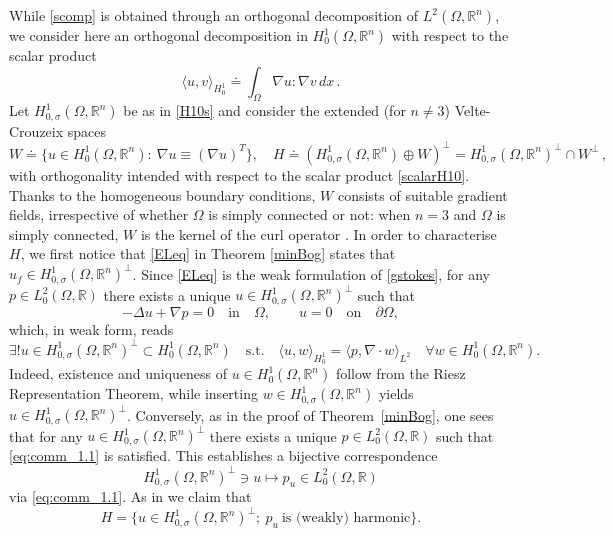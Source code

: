 \documentclass[11pt]{article}
\theoremstyle{plain}
\theoremstyle{definition}
\numberwithin{equation}{section}
\newcommand{\R}{\mathbb{R}}
\begin{document}
While \eqref{scomp} is obtained through an orthogonal decomposition of $L^2(\Omega,\R^n)$, we consider here an orthogonal decomposition
in $H^1_0(\Omega,\R^n)$ with respect to the scalar product
\begin{equation}\label{scalarH10}
\langle u,v\rangle_{H^1_0}\doteq\int_\Omega \nabla u : \nabla v\, dx\, .
\end{equation}
Let $H^1_{0,\sigma}(\Omega,\R^n)$ be as in \eqref{H10s} and consider the extended (for $n\neq3$) Velte-Crouzeix spaces
\begin{equation}\label{spaces}
W\doteq\{u\in H^1_0(\Omega,\R^n):\ \nabla u \equiv (\nabla u)^{T} \},\quad
H\doteq(H^1_{0,\sigma}(\Omega,\R^n) \oplus W)^\perp=H^1_{0,\sigma}(\Omega,\R^n)^\perp\cap W^\perp\, ,
\end{equation}
with orthogonality intended with respect to the scalar product \eqref{scalarH10}.
Thanks to the homogeneous boundary conditions, $W$ consists of suitable gradient fields, irrespective of whether $\Omega$ is simply connected or not: when $n=3$ and $\Omega$ is simply connected, $W$ is the kernel of the curl operator \cite{velte2}.
In order to characterise $H$, we first notice that \eqref{ELeq} in Theorem \ref{minBog} states that $u_f\in H^1_{0,\sigma}(\Omega,\R^n)^\perp$.
Since \eqref{ELeq} is the weak formulation of \eqref{gstokes}, for any $p\in L^2_0 (\Omega,\R)$ there exists a unique $u\in H^1_{0,\sigma}(\Omega,\R^n)^\perp$ such that
\begin{equation}\label{eq:comm_1.2}
-\Delta u+\nabla p=0\quad \mbox{in}\quad  \Omega, \qquad u=0\quad \mbox{on}\quad \partial \Omega,
\end{equation}
which, in weak form, reads
\begin{equation}\label{eq:comm_1.1}
	\exists ! u\in H^1_{0,\sigma}(\Omega,\R^n)^\perp\subset H^1_0(\Omega,\R^n)\quad\mbox{s.t.}\quad
	\langle  u,w\rangle_{H^1_0} =\langle p,\nabla \cdot w \rangle_{L^2}\quad \forall w\in  H^1_0(\Omega,\R^n).
\end{equation}
Indeed, existence and uniqueness of $u\in H^1_0(\Omega,\R^n)$ follow from the Riesz Representation Theorem, while inserting
$w\in H^1_{0,\sigma}(\Omega,\R^n)$ yields $u\in H^1_{0,\sigma}(\Omega,\R^n)^\perp$. Conversely, as in the proof of Theorem~\ref{minBog}, one sees that for any
$u\in H^1_{0,\sigma}(\Omega,\R^n)^\perp$ there exists a unique $p\in L^2_0 (\Omega,\R)$ such that \eqref{eq:comm_1.1} is satisfied.
This establishes a bijective correspondence
$$
H^1_{0,\sigma}(\Omega,\R^n)^\perp\ni u \mapsto p_u\in  L^2_0 (\Omega,\R)
$$
via \eqref{eq:comm_1.1}. As in \cite[Theorem 1]{Velte_LNM1431_1990} we claim that
\begin{equation}\label{charH}	
H=\{u\in H^1_{0,\sigma}(\Omega,\R^n)^\perp;\ p_u \ \mbox{is (weakly) harmonic}\}.
\end{equation}
\end{document}
